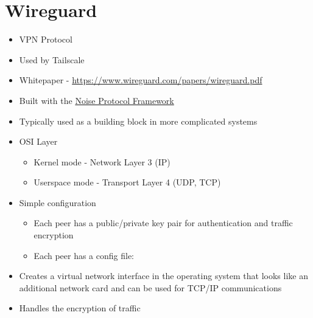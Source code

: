 \hypertarget{wireguard}{%
\section{Wireguard}\label{wireguard}}

\begin{itemize}
\tightlist
\item
  VPN Protocol
\item
  Used by Tailscale
\item
  Whitepaper - \url{https://www.wireguard.com/papers/wireguard.pdf}
\item
  Built with the \href{notes/02022-noise.md}{Noise Protocol Framework}
\item
  Typically used as a building block in more complicated systems
\item
  OSI Layer

  \begin{itemize}
  \tightlist
  \item
    Kernel mode - Network Layer 3 (IP)
  \item
    Userspace mode - Transport Layer 4 (UDP, TCP)
  \end{itemize}
\item
  Simple configuration

  \begin{itemize}
  \item
    Each peer has a public/private key pair for authentication and
    traffic encryption
  \item
    Each peer has a config file:

\begin{Shaded}
\begin{Highlighting}[]
\KeywordTok{[}\KeywordTok{]}
 \OperatorTok{=} \ErrorTok{/}
 \OperatorTok{=} 
 \OperatorTok{=} \OperatorTok{=}

\KeywordTok{[}\KeywordTok{]}
 \OperatorTok{=} \ErrorTok{+}\ErrorTok{+}\ErrorTok{/}\ErrorTok{+}\OperatorTok{=}
 \OperatorTok{=} \ErrorTok{/}
 \OperatorTok{=} \ErrorTok{:}
 \OperatorTok{=} 
\end{Highlighting}
\end{Shaded}
  \end{itemize}
\item
  Creates a virtual network interface in the operating system that looks
  like an additional network card and can be used for TCP/IP
  communications
\item
  Handles the encryption of traffic


\end{itemize}
